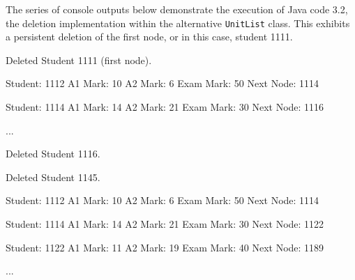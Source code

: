 \newpage
\noindent
The series of console outputs below demonstrate the execution of Java code 3.2, the deletion implementation within the alternative \texttt{UnitList} class. This exhibits a persistent deletion of the first node, or in this case, student 1111.
\\
\begin{consolecode}
Deleted Student 1111 (first node).

Student: 1112
A1 Mark: 10
A2 Mark: 6
Exam Mark: 50
Next Node: 1114

Student: 1114
A1 Mark: 14
A2 Mark: 21
Exam Mark: 30
Next Node: 1116

...
\end{consolecode}

\begin{consolecode}
Deleted Student 1116.

Deleted Student 1145.

Student: 1112
A1 Mark: 10
A2 Mark: 6
Exam Mark: 50
Next Node: 1114

Student: 1114
A1 Mark: 14
A2 Mark: 21
Exam Mark: 30
Next Node: 1122

Student: 1122
A1 Mark: 11
A2 Mark: 19
Exam Mark: 40
Next Node: 1189

...
\end{consolecode}